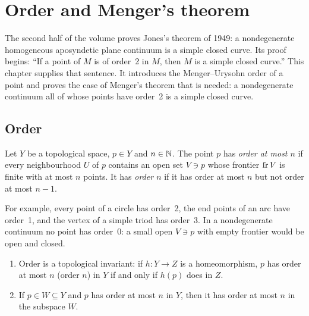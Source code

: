 \chapter{Order and Menger's theorem}\label{ch:order}

The second half of the volume proves Jones's theorem of 1949: a nondegenerate homogeneous aposyndetic plane
continuum is a simple closed curve. Its proof begins: ``If a point of $M$ is of order~2 in $M$, then $M$ is a
simple closed curve.'' This chapter supplies that sentence. It introduces the Menger--Urysohn order of a point
and proves the case of Menger's theorem that is needed: a nondegenerate continuum all of whose points have
order~2 is a simple closed curve.

\section{Order}

\begin{definition}\label{def:order}
Let $Y$ be a topological space, $p\in Y$ and $n\in\mathbb{N}$. The point $p$ has \emph{order at most $n$} if every
neighbourhood $U$ of $p$ contains an open set $V\ni p$ whose frontier $\operatorname{fr} V$ is finite with at most $n$ points. It has
\emph{order $n$} if it has order at most $n$ but not order at most $n-1$.
\end{definition}


For example, every point of a circle has order~2, the end points of an arc have order~1, and the vertex of a
simple triod has order~3. In a nondegenerate continuum no point has order~$0$: a small open $V\ni p$ with empty
frontier would be open and closed.

\begin{lemma}\label{lem:order-basic}
\leavevmode
\begin{enumerate}[label=(\alph*)]
\item Order is a topological invariant: if $h\colon Y\to Z$ is a homeomorphism, $p$ has order at most $n$ (order $n$)
in $Y$ if and only if $h(p)$ does in $Z$.
\item If $p\in W\subseteq Y$ and $p$ has order at most $n$ in $Y$, then it has order at most $n$ in the subspace $W$.
\end{enumerate}
\end{lemma}

